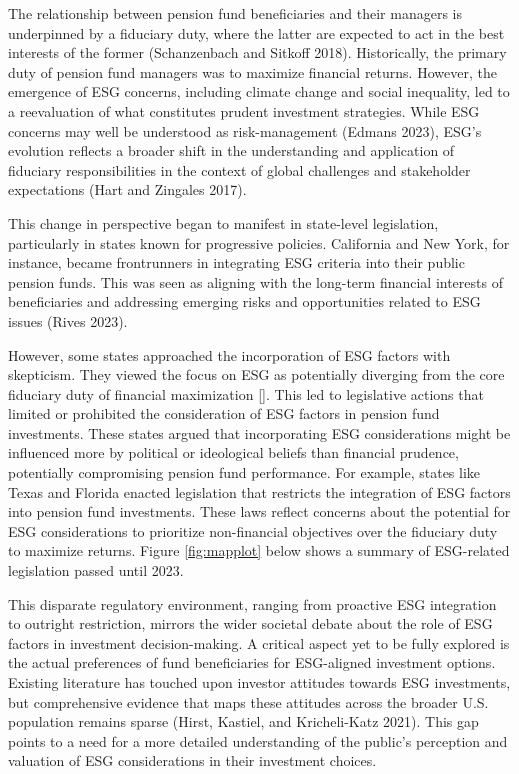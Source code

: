 \documentclass[
  12pt,
]{article}
\begin{document}
The relationship between pension fund beneficiaries and their managers is underpinned by a fiduciary duty, where the latter are expected to act in the best interests of the former (Schanzenbach and Sitkoff 2018). Historically, the primary duty of pension fund managers was to maximize financial returns. However, the emergence of ESG concerns, including climate change and social inequality, led to a reevaluation of what constitutes prudent investment strategies. While ESG concerns may well be understood as risk-management (Edmans 2023), ESG's evolution reflects a broader shift in the understanding and application of fiduciary responsibilities in the context of global challenges and stakeholder expectations (Hart and Zingales 2017).

This change in perspective began to manifest in state-level legislation, particularly in states known for progressive policies. California and New York, for instance, became frontrunners in integrating ESG criteria into their public pension funds. This was seen as aligning with the long-term financial interests of beneficiaries and addressing emerging risks and opportunities related to ESG issues (Rives 2023).

However, some states approached the incorporation of ESG factors with skepticism. They viewed the focus on ESG as potentially diverging from the core fiduciary duty of financial maximization {[}{]}. This led to legislative actions that limited or prohibited the consideration of ESG factors in pension fund investments. These states argued that incorporating ESG considerations might be influenced more by political or ideological beliefs than financial prudence, potentially compromising pension fund performance. For example, states like Texas and Florida enacted legislation that restricts the integration of ESG factors into pension fund investments. These laws reflect concerns about the potential for ESG considerations to prioritize non-financial objectives over the fiduciary duty to maximize returns. Figure \ref{fig:mapplot} below shows a summary of ESG-related legislation passed until 2023.

This disparate regulatory environment, ranging from proactive ESG integration to outright restriction, mirrors the wider societal debate about the role of ESG factors in investment decision-making. A critical aspect yet to be fully explored is the actual preferences of fund beneficiaries for ESG-aligned investment options. Existing literature has touched upon investor attitudes towards ESG investments, but comprehensive evidence that maps these attitudes across the broader U.S. population remains sparse (Hirst, Kastiel, and Kricheli-Katz 2021). This gap points to a need for a more detailed understanding of the public's perception and valuation of ESG considerations in their investment choices.
\end{document}
